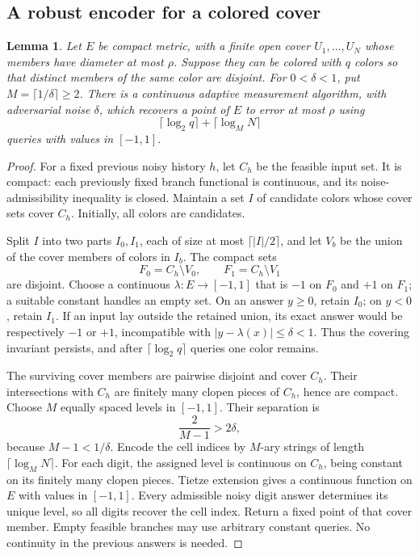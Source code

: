 \documentclass[11pt,a4paper]{article}
\newcommand{\abs}[1]{\left\lvert#1\right\rvert}
\newtheorem{lemma}[theorem]{Lemma}
\theoremstyle{definition}
\theoremstyle{remark}
\numberwithin{equation}{section}
\begin{document}
\subsection{A robust encoder for a colored cover}

\begin{lemma}
\label{lem:coloredencoder}
Let \(E\) be compact metric, with a finite open cover
\(U_1,\ldots,U_N\) whose members have diameter at most \(\rho\).
Suppose they can be colored with \(q\) colors so that distinct
members of the same color are disjoint. For \(0<\delta<1\), put
\(M=\lceil1/\delta\rceil\ge2\). There is a continuous adaptive
measurement algorithm, with adversarial noise \(\delta\), which
recovers a point of \(E\) to error at most \(\rho\) using
\[
                     \lceil\log_2q\rceil+
                     \lceil\log_M N\rceil
 \tag{C1}
\]
queries with values in \([-1,1]\).
\end{lemma}

\begin{proof}
For a fixed previous noisy history \(h\), let \(C_h\) be the feasible
input set. It is compact: each previously fixed branch functional is
continuous, and its noise-admissibility inequality is closed.
Maintain a set \(I\) of candidate colors whose cover sets cover \(C_h\).
Initially, all colors are candidates.

Split \(I\) into two parts \(I_0,I_1\), each of size at most
\(\lceil\abs I/2\rceil\), and let \(V_b\) be the union of the cover
members of colors in \(I_b\). The compact sets
\[
                       F_0=C_h\setminus V_0,\qquad
                       F_1=C_h\setminus V_1
 \tag{C2}
\]
are disjoint. Choose a continuous \(\lambda:E\to[-1,1]\) that is
\(-1\) on \(F_0\) and \(+1\) on \(F_1\); a suitable constant
handles an empty set. On an answer \(y\ge0\), retain \(I_0\); on
\(y<0\), retain \(I_1\). If an input lay outside the retained union,
its exact answer would be respectively \(-1\) or \(+1\), incompatible
with \(\abs{y-\lambda(x)}\le\delta<1\). Thus the covering invariant
persists, and after \(\lceil\log_2q\rceil\) queries one color remains.

The surviving cover members are pairwise disjoint and cover \(C_h\).
Their intersections with \(C_h\) are finitely many clopen pieces of
\(C_h\), hence are compact. Choose \(M\) equally spaced levels in
\([-1,1]\). Their separation is
\[
                             \frac{2}{M-1}>2\delta ,
 \tag{C3}
\]
because \(M-1<1/\delta\). Encode the cell indices by \(M\)-ary
strings of length \(\lceil\log_M N\rceil\). For each digit, the
assigned level is continuous on \(C_h\), being constant on its
finitely many clopen pieces. Tietze extension gives a continuous
function on \(E\) with values in \([-1,1]\). Every admissible noisy
digit answer determines its unique level, so all digits recover the
cell index. Return a fixed point of that cover member. Empty feasible
branches may use arbitrary constant queries. No continuity in the
previous answers is needed.
\end{proof}
\end{document}
